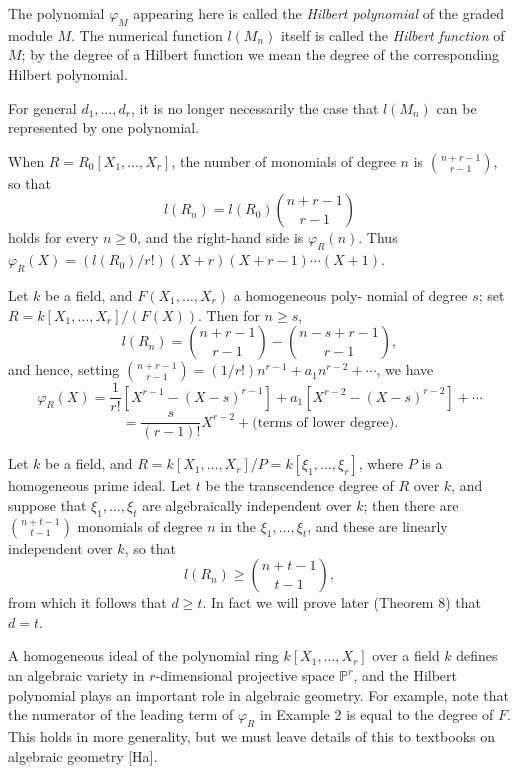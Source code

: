 The polynomial $\varphi_M$ appearing here is called the \emph{Hilbert polynomial} of the
graded module $M$. The numerical function $l(M_n)$ itself is called the \emph{Hilbert}
\emph{function} of $M$; by the degree of a Hilbert function we mean the degree of the
corresponding Hilbert polynomial.

\begin{remark}
For general $d_1, \ldots, d_r$, it is no longer necessarily the case that $l(M_n)$
can be represented by one polynomial.
\end{remark}

\begin{example}\label{ex:13.1}
When $R = R_0[X_1, \ldots, X_r]$, the number of monomials of
degree $n$ is $\binom{n+r-1}{r-1}$, so that
\[
  l(R_n) = l(R_0)\binom{n+r-1}{r-1}
\]
holds for every $n \ge 0$, and the right-hand side is $\varphi_R(n)$. Thus $\varphi_R(X) =
(l(R_0)/r!)(X + r)(X + r - 1) \cdots (X + 1)$.
\end{example}

\begin{example}\label{ex:13.2}
Let $k$ be a field, and $F(X_1, \ldots, X_r)$ a homogeneous poly-
nomial of degree $s$; set $R = k[X_1, \ldots, X_r]/(F(X))$. Then for $n \ge s$,
\[
  l(R_n) = \binom{n+r-1}{r-1} - \binom{n-s+r-1}{r-1},
\]
and hence, setting $\binom{n+r-1}{r-1} = (1/r!)n^{r-1} + a_1n^{r-2} + \cdots$, we have
\[
  \varphi_R(X) = \frac{1}{r!}[X^{r-1} - (X - s)^{r-1}] + a_1[X^{r-2} - (X - s)^{r-2}] + \cdots
\]
\[
  = \frac{s}{(r-1)!}X^{r-2} + \text{(terms of lower degree)}.
\]
\end{example}

\begin{example}\label{ex:13.3}
Let $k$ be a field, and $R = k[X_1, \ldots, X_r]/P = k[\xi_1, \ldots, \xi_r]$,
where $P$ is a homogeneous prime ideal. Let $t$ be the transcendence degree
of $R$ over $k$, and suppose that $\xi_1, \ldots, \xi_t$ are algebraically independent
over $k$; then there are $\binom{n+t-1}{t-1}$ monomials of degree $n$ in the
$\xi_1, \ldots, \xi_t$, and these are linearly independent over $k$, so that
\[
  l(R_n) \ge \binom{n+t-1}{t-1},
\]
from which it follows that $d \ge t$. In fact we will prove
later (Theorem 8) that $d = t$.
\end{example}

A homogeneous ideal of the polynomial ring $k[X_1, \ldots, X_r]$ over a field
$k$ defines an algebraic variety in $r$-dimensional projective space $\mathbb{P}^r$, and
the Hilbert polynomial plays an important role in algebraic geometry.
For example, note that the numerator of the leading term of $\varphi_R$ in Example
2 is equal to the degree of $F$. This holds in more generality, but we must
leave details of this to textbooks on algebraic geometry [Ha].

